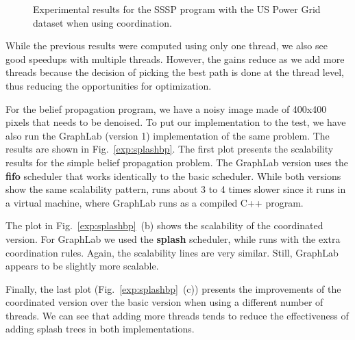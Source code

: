 \begin{figure}[h!]
     \centering
   \caption{Experimental results for the SSSP program with the US Power Grid dataset when using coordination.}
   \label{exp:sssp-uspowergrid}
\end{figure}

While the previous results were computed using only one thread, we also see good speedups with multiple threads. However, the gains reduce as we add
more threads because the decision of picking the best path is done at the thread level, thus reducing the opportunities for optimization.

For the belief propagation program, we have a noisy image made of 400x400 pixels that needs to be denoised.
To put our implementation to the test, we have also run the GraphLab (version 1) implementation of the same problem. The results are shown
in Fig.~\ref{exp:splashbp}. The first plot presents the scalability results for the simple belief propagation problem. The GraphLab version
uses the \textbf{fifo} scheduler that works identically to the basic \lang scheduler. While both versions show the same scalability pattern,
\lang runs about 3 to 4 times slower since it runs in a virtual machine, where GraphLab runs as a compiled C++ program.

\begin{figure*}[ht]
   \centering
   \caption{Experimental results for belief propagation with coordination using splashes. The dataset is a 400x400 image.}
   \label{exp:splashbp}
\end{figure*}

The plot in Fig.~\ref{exp:splashbp}~(b) shows the scalability of the coordinated version. For GraphLab we used the \textbf{splash} scheduler, while \lang
runs with the extra coordination rules. Again, the scalability lines are very similar. Still, GraphLab appears to be slightly more scalable.

Finally, the last plot (Fig.~\ref{exp:splashbp}~(c)) presents the improvements of the coordinated version over the basic version when using a different
number of threads. We can see that adding more threads tends to reduce the effectiveness of adding splash trees in both implementations.

